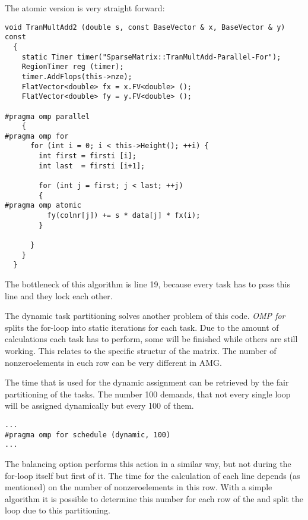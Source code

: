 \documentclass[a4paper,11pt]{scrartcl}
\begin{document}
The atomic version is very straight forward:

\begin{lstlisting}
void TranMultAdd2 (double s, const BaseVector & x, BaseVector & y) const
  {
    static Timer timer("SparseMatrix::TranMultAdd-Parallel-For");
    RegionTimer reg (timer);
    timer.AddFlops(this->nze);
    FlatVector<double> fx = x.FV<double> ();
    FlatVector<double> fy = y.FV<double> ();

#pragma omp parallel
    {
#pragma omp for
      for (int i = 0; i < this->Height(); ++i) {
        int first = firsti [i];
        int last  = firsti [i+1];

        for (int j = first; j < last; ++j)
        {
#pragma omp atomic
          fy(colnr[j]) += s * data[j] * fx(i);
        }

      }
    }
  }

\end{lstlisting}

The bottleneck of this algorithm is line 19, because every task has to pass this
line and they lock each other.

The dynamic task partitioning solves another problem of this code. {\em OMP for}
 splits the for-loop into static iterations for each task. Due to the amount
 of calculations each task has to perform, some will be finished while others
are still working. This relates to the specific structur of the matrix. The
 number of nonzeroelements in euch row can be very different in AMG.

The time that is used for the dynamic assignment can be retrieved by the fair
partitioning of the tasks. The number 100 demands, that not every single loop
 will be assigned dynamically but every 100 of them.

\begin{lstlisting}
...
#pragma omp for schedule (dynamic, 100)
...
\end{lstlisting}

The balancing option performs this action in a similar way, but not during the 
for-loop itself but first of it. The time for the calculation of each line
depends (as mentioned) on the number of nonzeroelements in this row. With a 
simple algorithm it is possible to  determine this number for each row of the 
 and split the loop due to this partitioning.
\end{document}
